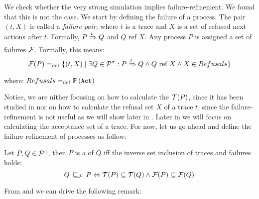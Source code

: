 We check whether the very strong simulation implies failure-refinement. We found that this is not the case. We start by defining the failure of a process.
The pair $(t, X)$ is called a \textit{failure pair}, where $t$ is a trace and $X$ is a set of refused next actions after $t$. Formally, $P \xRightarrow{t} Q$ and $Q$ ref $X$. Any process
$P$ is assigned a set of failures $\Failures[]$. Formally, this means:
\begin{align}
    \Failures[P] \define \{(t,X) \mid \exists Q\in\procs: P \bigstep{t} Q \wedge Q \text{ ref } X \wedge X\in Refusals\}
\end{align}
where: $Refusals =_{\mathrm{def}} \mathbb P\left(\mathtt{Act}\right)$

Notice, we are nither focusing on how to calculate the $\Traces[P]$, since it has been studied in \cite{gieseking} nor on how to calculate the refusal set $X$ of a trace $t$, since the failure-refinement is not useful as we will show later in . Later in  we will focus on calculating the acceptance set of a trace.
For now, let us go ahead and define the failure-refinement of \picalc{} processes as follow:

\begin{definition}
\label{def_failure_ref}
	Let $P,Q\in\mathcal P^{\pi}$, then $P$ is a  of $Q$ iff the inverse set inclusion of traces and failures holds:
   \[Q \refiF P \Leftrightarrow  \Traces[P]\subseteq\Traces[Q] \wedge \Failures[P]\subseteq\Failures[Q]\]
\end{definition}

From  and  we can drive the following remark: 

